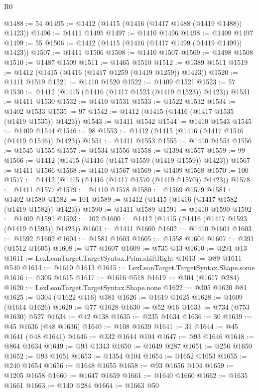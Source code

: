 \begin{lexlean}{R0}
\begin{coremodule}
@1488 := 54
@1495 := @1412 (@1415 (@1416 (@1417 @1488 (@1419 @1488)) @1423))
@1496 := @1411 @1495
@1497 := @1410 @1496
@1498 := @1409 @1497
@1499 := 55
@1506 := @1412 (@1415 (@1416 (@1417 @1499 (@1419 @1499)) @1423))
@1507 := @1411 @1506
@1508 := @1410 @1507
@1509 := @1498 @1508
@1510 := @1487 @1509
@1511 := @1465 @1510
@1512 := @1389 @1511
@1519 := @1412 (@1415 (@1416 (@1417 @1259 (@1419 @1259)) @1423))
@1520 := @1411 @1519
@1521 := @1410 @1520
@1522 := @1409 @1521
@1523 := 57
@1530 := @1412 (@1415 (@1416 (@1417 @1523 (@1419 @1523)) @1423))
@1531 := @1411 @1530
@1532 := @1410 @1531
@1533 := @1522 @1532
@1534 := @1402 @1533
@1535 := 97
@1542 := @1412 (@1415 (@1416 (@1417 @1535 (@1419 @1535)) @1423))
@1543 := @1411 @1542
@1544 := @1410 @1543
@1545 := @1409 @1544
@1546 := 98
@1553 := @1412 (@1415 (@1416 (@1417 @1546 (@1419 @1546)) @1423))
@1554 := @1411 @1553
@1555 := @1410 @1554
@1556 := @1545 @1555
@1557 := @1534 @1556
@1558 := @1394 @1557
@1559 := 99
@1566 := @1412 (@1415 (@1416 (@1417 @1559 (@1419 @1559)) @1423))
@1567 := @1411 @1566
@1568 := @1410 @1567
@1569 := @1409 @1568
@1570 := 100
@1577 := @1412 (@1415 (@1416 (@1417 @1570 (@1419 @1570)) @1423))
@1578 := @1411 @1577
@1579 := @1410 @1578
@1580 := @1569 @1579
@1581 := @1402 @1580
@1582 := 101
@1589 := @1412 (@1415 (@1416 (@1417 @1582 (@1419 @1582)) @1423))
@1590 := @1411 @1589
@1591 := @1410 @1590
@1592 := @1409 @1591
@1593 := 102
@1600 := @1412 (@1415 (@1416 (@1417 @1593 (@1419 @1593)) @1423))
@1601 := @1411 @1600
@1602 := @1410 @1601
@1603 := @1592 @1602
@1604 := @1581 @1603
@1605 := @1558 @1604
@1607 := @391 (@1512 @1605)
@1608 := @77 @1607
@1609 := @735 @13
@1610 := @291 @13
@1611 := LexLeanTarget.TargetSyntax.Prim.shiftRight
@1613 := @89 @1611 @540
@1614 := @1610 @1613
@1615 := LexLeanTarget.TargetSyntax.Shape.some
@1616 := @305 @1615
@1617 := @1616 @518
@1619 := @304 (@1617 @284)
@1620 := LexLeanTarget.TargetSyntax.Shape.none
@1622 := @305 @1620 @81
@1625 := @304 (@1622 @416) @381
@1626 := @1619 @1625
@1628 := @1609 (@1614 @1626)
@1629 := @77 @1628
@1630 := @52 @16
@1633 := @734 (@753 @1630) @527
@1634 := @42 @138
@1635 := @235 @1634
@1636 := 30
@1639 := @45 @1636 (@48 @1636)
@1640 := @108 @1639
@1641 := 31
@1644 := @45 @1641 (@48 @1641)
@1646 := @332 @1644 @104
@1647 := @93 @1646
@1648 := @864 @1634
@1649 := @93 @1343
@1650 := @1649 @287
@1651 := @256 @1650
@1652 := @93 @1651
@1653 := @1354 @104
@1654 := @1652 @1653
@1655 := @240 @1654
@1656 := @1648 @1655
@1658 := @93 @1656 @104
@1659 := @1205 @1658
@1660 := @1647 @1659
@1661 := @1640 @1660
@1662 := @1635 @1661
@1663 := @140 @284
@1664 := @1663 @50

\end{coremodule}
\end{lexlean}
